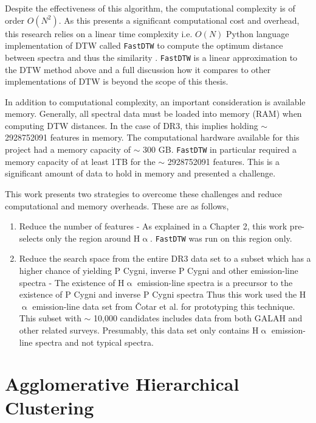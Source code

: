 Despite the effectiveness of this algorithm, the computational complexity is of order $O(N^2)$. As this presents a significant computational cost and overhead, this research relies on a linear time complexity i.e. $O(N)$ Python language implementation of DTW called \texttt{FastDTW} to compute the optimum distance between spectra and thus the similarity \cite{salvador2007toward}. \texttt{FastDTW} is a linear approximation to the DTW method above and a full discussion how it compares to other implementations of DTW is beyond the scope of this thesis. 

In addition to computational complexity, an important consideration is available memory. Generally, all spectral data must be loaded into memory (RAM) when computing DTW distances. In the case of DR3, this implies holding $\sim$ \num[round-precision=2,round-mode=figures, scientific-notation=true]{2928752091} features in memory. The computational hardware available for this project had a memory capacity of $\sim$ 300 GB. \texttt{FastDTW} in particular required a memory capacity of at least 1TB for the $\sim$ \num[round-precision=2,round-mode=figures, scientific-notation=true]{2928752091} features. This is a significant amount of data to hold in memory and presented a challenge.

This work presents two strategies to overcome these challenges and reduce computational and memory overheads. These are as follows,

\begin{enumerate}
    \item Reduce the number of features - As explained in a Chapter 2, this work pre-selects only the region around H$\upalpha$. \texttt{FastDTW} was run on this region only.
    \item Reduce the search space from the entire DR3 data set to a subset which has a higher chance of yielding P Cygni, inverse P Cygni and other emission-line spectra - The existence of H$\upalpha$ emission-line spectra is a precursor to the existence of P Cygni and inverse P Cygni spectra Thus this work used the H$\upalpha$ emission-line data set from Čotar et al.\cite{vcotar2021galah} for prototyping this technique. This subset with $\sim$ 10,000 candidates includes data from both GALAH and other related surveys. Presumably, this data set only contains H$\upalpha$ emission-line spectra and not typical spectra.
\end{enumerate}

\section{Agglomerative Hierarchical Clustering}

